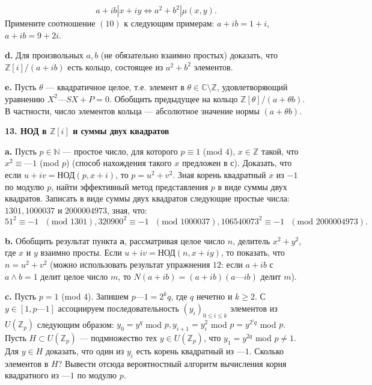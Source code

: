 \documentclass{mai_book}
\begin{document}
\[
a+ib|x+iy\Longleftrightarrow a^2+b^2|\mu(x,y).
\]
Примените соотношение $(10)$ к следующим примерам: $a + ib = 1 + i$,
$a + ib = 9 + 2i$.

\textbf{d.} Для произвольных $a, b$ (не обязательно взаимно простых) 
доказать, что $\mathbb{Z}[i]/(a+ib)$ есть кольцо, состоящее из $a^2 + b^2$ элементов.

\textbf{e.} Пусть $\theta$ — квадратичное целое, т.е. элемент в $\theta \in \mathbb{C}\setminus\mathbb{Z}$, удовлетворяющий уравнению $X^2 — SX + P = 0$. Обобщить предыдущее на кольцо $\mathbb{Z}[\theta] / (a + \theta b)$. В частности, число элементов кольца — абсолютное значение нормы $(a + \theta b)$.

\pagebreak

\noindent \textbf{13. НОД в $\mathbb{Z}[i]$ и суммы двух квадратов}

\textbf{a.} Пусть $p \in \mathbb{N}$ — простое число, для которого $p \equiv 1$ (mod $4$), $x \in \mathbb{Z}$ такой, что $x^2 \equiv —1$ (mod $p$) (способ нахождения такого $x$ предложен в с). Доказать, что если $u + iv = $НОД$(p, x + i)$, то $p = u^2 + v^2$. Зная корень квадратный $x$ из $-1$ по модулю $p$, найти эффективный метод представления $p$ в виде суммы двух квадратов. Записать в виде суммы двух квадратов следующие простые числа: $1301, 1000037$ и $2 000 004 973$, зная, что:
\[
51^2 \equiv -1 \text{ } (\text{mod } 1301), 320900^2 \equiv -1 \text{ } (\text{mod } 1000037), 106540073^2 \equiv -1 \text{ } (\text{mod } 2000004973).
\]

\textbf{b.} Обобщить результат пункта \textbf{a}, рассматривая целое число $n$, делитель $x^2 + y^2$, где $x$ и $y$ взаимно просты. Если $u+iv = $НОД$(n, x + iy)$, то показать, что $n=u^2+v^2$ (можно использовать результат 
упражнения $12$: если $a + ib$ с $a \wedge b = 1$ делит целое число $m$, то $N(a + ib) = (a + ib)(a — ib)$ делит $m$).

\textbf{c.} Пусть $p = 1$ (mod $4$). Запишем $p—1 = 2^kq$, где $q$ нечетно и $k \ge 2$. С $y \in [1,p—1]$ ассоциируем последовательность $(y_i)_{0\le i\le k}$ элементов из $U(\mathbb{Z}_p)$ следующим образом: $y_0 = y^q$ mod $p, y_{i+1} = y^2_i$ mod $p = y^{2^iq}$ mod $p$. Пусть $H \subset U(\mathbb{Z}_p)$ — подмножество тех $y \in U(\mathbb{Z}_p)$, что $y_1 = y^{2q}$ mod $p \ne
1$. Для $y \in H$ доказать, что один из $y_i$ есть корень квадратный из $—1$.
Сколько элементов в $H$? Вывести отсюда вероятностный алгоритм 
вычисления корня квадратного из $—1$ по модулю $p$.
\\
\end{document}
